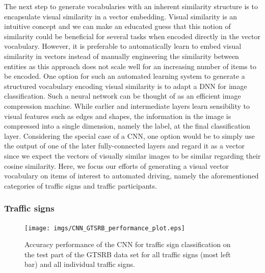 The next step to generate vocabularies with an inherent similarity structure is to encapsulate visual similarity in a vector embedding.
Visual similarity is an intuitive concept and we can make an educated guess that this notion of similarity could be beneficial for several tasks when encoded directly in the vector vocabulary. 
However, it is preferable to automatically learn to embed visual similarity in vectors instead of manually engineering the similarity between entities as this approach does not scale well for an increasing number of items to be encoded.
One option for such an automated learning system to generate a structured vocabulary encoding visual similarity is to adapt a \acf{DNN} for image classification.
Such a neural network can be thought of as an efficient image compression machine.
While earlier and intermediate layers learn sensibility to visual features such as edges and shapes, the information in the image is compressed into a single dimension, namely the label, at the final classification layer.
Considering the special case of a \acf{CNN}, one option would be to simply use the output of one of the later fully-connected layers and regard it as a vector since we expect the vectors of visually similar images to be similar regarding their cosine similarity.
Here, we focus our efforts of generating a visual vector vocabulary on items of interest to automated driving, namely the aforementioned categories of traffic signs and traffic participants.

\subsubsection{Traffic signs}%
\label{ssubsec:traffic_signs}

\begin{figure}[t]
    \centering
    \texttt{[image: imgs/CNN\_GTSRB\_performance\_plot.eps]}
    \caption{Accuracy performance of the \ac{CNN} for traffic sign classification on the test part of the \ac{GTSRB} data set for all traffic signs (most left bar) and all individual traffic signs.}
    \label{fig:CNN_GTSRB_performance_plot}
\end{figure}

